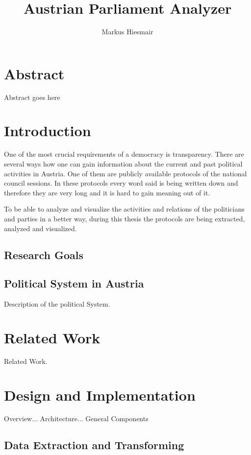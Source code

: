 \documentclass[12pt]{report}
\title{Austrian Parliament Analyzer}
\author{Markus Hiesmair}
\begin{document}
\maketitle
\newpage

\chapter*{Abstract}
Abstract goes here

\tableofcontents


\chapter{Introduction}
One of the most crucial requirements of a democracy is transparency. There are several ways how one can gain information about the current and past political activities in Austria. One of them are publicly available protocols of the national council sessions. In these protocols every word said is being written down and therefore they are very long and it is hard to gain meaning out of it.

To be able to analyze and visualize the activities and relations of the politicians and parties in a better way, during this thesis the protocols are being extracted, analyzed and visualized. 

\section{Research Goals}


\section{Political System in Austria}
Description of the political System.

\chapter{Related Work}
Related Work.

\chapter{Design and Implementation}

Overview... Architecture... General Components

\section{Data Extraction and Transforming}
\end{document}
